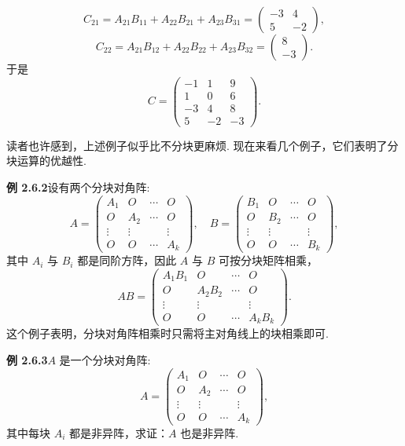 \documentclass[UTF8, 12pt, fontset=fandol, oneside]{ctexart}
\begin{document}
\[
C_{21}=A_{21}B_{11}+A_{22}B_{21}+A_{23}B_{31}=
\left(\begin{array}{rr}
-3 & 4\\
5 & -2
\end{array}\right),
\]
\[
C_{22}=A_{21}B_{12}+A_{22}B_{22}+A_{23}B_{32}=
\left(\begin{array}{r}
8\\
-3
\end{array}\right).
\]
于是
\[
C=\left(\begin{array}{rr|r}
-1 & 1 & 9\\
1 & 0 & 6\\ \hline
-3 & 4 & 8\\
5 & -2 & -3
\end{array}\right).
\]

读者也许感到，上述例子似乎比不分块更麻烦. 现在来看几个例子，它们表明了分块运算的优越性.

\noindent\textbf{例 2.6.2}\quad 设有两个分块对角阵:
\[
A=\left(\begin{array}{cccc}
A_1 & O & \cdots & O\\
O & A_2 & \cdots & O\\
\vdots & \vdots & & \vdots\\
O & O & \cdots & A_k
\end{array}\right),\quad
B=\left(\begin{array}{cccc}
B_1 & O & \cdots & O\\
O & B_2 & \cdots & O\\
\vdots & \vdots & & \vdots\\
O & O & \cdots & B_k
\end{array}\right),
\]
其中 $A_i$ 与 $B_i$ 都是同阶方阵，因此 $A$ 与 $B$ 可按分块矩阵相乘，
\[
AB=\left(\begin{array}{cccc}
A_1B_1 & O & \cdots & O\\
O & A_2B_2 & \cdots & O\\
\vdots & \vdots & & \vdots\\
O & O & \cdots & A_kB_k
\end{array}\right).
\]
这个例子表明，分块对角阵相乘时只需将主对角线上的块相乘即可.

\noindent\textbf{例 2.6.3}\quad $A$ 是一个分块对角阵:
\[
A=\left(\begin{array}{cccc}
A_1 & O & \cdots & O\\
O & A_2 & \cdots & O\\
\vdots & \vdots & & \vdots\\
O & O & \cdots & A_k
\end{array}\right),
\]
其中每块 $A_i$ 都是非异阵，求证：$A$ 也是非异阵.
\end{document}
